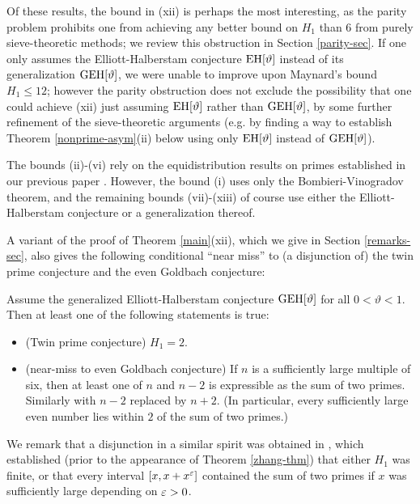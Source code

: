 Of these results, the bound in (xii) is perhaps the most interesting, as the parity problem \cite{selberg} prohibits one from achieving any better bound on $H_1$ than $6$ from purely sieve-theoretic methods; we review this obstruction in Section \ref{parity-sec}.  If one only assumes the Elliott-Halberstam conjecture $\operatorname*{EH}[\vartheta]$ instead of its generalization $\operatorname*{GEH}[\vartheta]$, we were unable to improve upon Maynard's bound $H_1 \leq 12$; however the parity obstruction does not exclude the possibility that one could achieve (xii) just assuming $\operatorname*{EH}[\vartheta]$ rather than $\operatorname*{GEH}[\vartheta]$, by some further refinement of the sieve-theoretic arguments (e.g. by finding a way to establish Theorem \ref{nonprime-asym}(ii) below using only $\operatorname*{EH}[\vartheta]$ instead of $\operatorname*{GEH}[\vartheta]$).

The bounds (ii)-(vi) rely on the equidistribution results on primes established in our previous paper \cite{polymath8a}.  However, the bound (i) uses only the Bombieri-Vinogradov theorem, and the remaining bounds (vii)-(xiii) of course use either the Elliott-Halberstam conjecture or a generalization thereof.

A variant of the proof of Theorem \ref{main}(xii), which we give in Section \ref{remarks-sec}, also gives the following conditional ``near miss'' to (a disjunction of) the twin prime conjecture and the even Goldbach conjecture:

\begin{theorem}[Disjunction]\label{disj} Assume the generalized Elliott-Halberstam conjecture $\operatorname*{GEH}[\vartheta]$ for all $0 < \vartheta < 1$.  Then at least one of the following statements is true:
\begin{itemize}
\item[(a)]  (Twin prime conjecture) $H_1=2$.
\item[(b)]  (near-miss to even Goldbach conjecture)  If $n$ is a sufficiently large multiple of six, then at least one of $n$ and $n-2$ is expressible as the sum of two primes.  Similarly with $n-2$ replaced by $n+2$.  (In particular, every sufficiently large even number lies within $2$ of the sum of two primes.)
\end{itemize}
\end{theorem}

We remark that a disjunction in a similar spirit was obtained in \cite{bgc}, which established (prior to the appearance of Theorem \ref{zhang-thm}) that either $H_1$ was finite, or that every interval $[x,x+x^\varepsilon]$ contained the sum of two primes if $x$ was sufficiently large depending on $\varepsilon>0$.  

